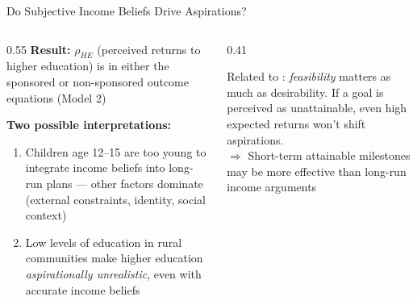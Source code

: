 \documentclass[aspectratio=169, 10pt]{beamer}
\begin{document}
\begin{frame}{Do Subjective Income Beliefs Drive Aspirations?}
  \begin{columns}
    \begin{column}{0.55\textwidth}
      \textbf{Result:} $\rho_{HE}$ (perceived returns to higher education) is  in either the sponsored or non-sponsored outcome equations (Model 2)

      \vspace{0.5em}
      \textbf{Two possible interpretations:}
      \begin{enumerate}
        \item Children age 12--15 are too young to integrate income beliefs into long-run plans — other factors dominate (external constraints, identity, social context)
        \item Low levels of education in rural communities make higher education \textit{aspirationally unrealistic}, even with accurate income beliefs
      \end{enumerate}
    \end{column}
    \begin{column}{0.41\textwidth}
      \begin{keybox}
        \small Related to \citet{Genicot2017}: \textit{feasibility} matters as much as desirability. If a goal is perceived as unattainable, even high expected returns won't shift aspirations.\\[0.5em]
        $\Rightarrow$ Short-term attainable milestones may be more effective than long-run income arguments
      \end{keybox}
    \end{column}
  \end{columns}
\end{frame}
\end{document}
